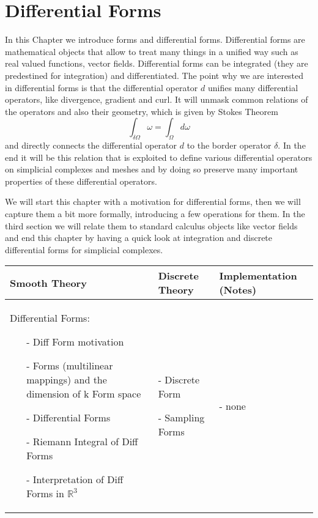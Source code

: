 \chapter{Differential Forms}
	In this Chapter we introduce forms and differential forms. Differential forms are mathematical objects that allow to treat many things in a unified way such as real valued functions, vector fields. Differential forms can be integrated (they are predestined for integration) and differentiated. The point why we are interested in differential forms is that the differential operator $d$ unifies many differential operators, like divergence, gradient and curl. It will unmask common relations of the operators and also their geometry, which is given by Stokes Theorem
	\[\int_{\delta \Omega} \omega = \int_{\Omega} d\omega\]
and directly connects the differential operator $d$ to the border operator $\delta$. In the end it will be this relation that is exploited to define various differential operators on simplicial complexes and meshes and by doing so preserve many important properties of these differential operators.

We will start this chapter with a motivation for differential forms, then we will capture them a bit more formally, introducing a few operations for them. In the third section we will relate them to standard calculus objects like vector fields and end this chapter by having a quick look at integration and discrete differential forms for simplicial complexes.
\begin{table}[h]
	\begin{longtable}{|p{4.5cm}|p{4.5cm}|p{4.5cm}|}
		\hline
		Smooth Theory& Discrete Theory& Implementation (Notes)\\
		\hline
			Differential Forms: \begin{itemize}
			  \setlength{\itemsep}{1pt}
			  \setlength{\parskip}{0pt}
				\setlength{\parsep}{0pt}
				\item[-]Diff Form motivation
				\item[-]Forms (multilinear mappings) and the dimension of k Form space 
				\item[-]Differential Forms 
				\item[-]Riemann Integral of Diff Forms 
				\item[-]Interpretation of Diff Forms in $\mathbb R^3$ 
			\end{itemize}
			&
			\begin{packed_enum}
				\item[-] Discrete Form
				\item[-] Sampling Forms
			\end{packed_enum}
			 & - none
			 \\		
		\hline
	\end{longtable}
	\end{table}
	
